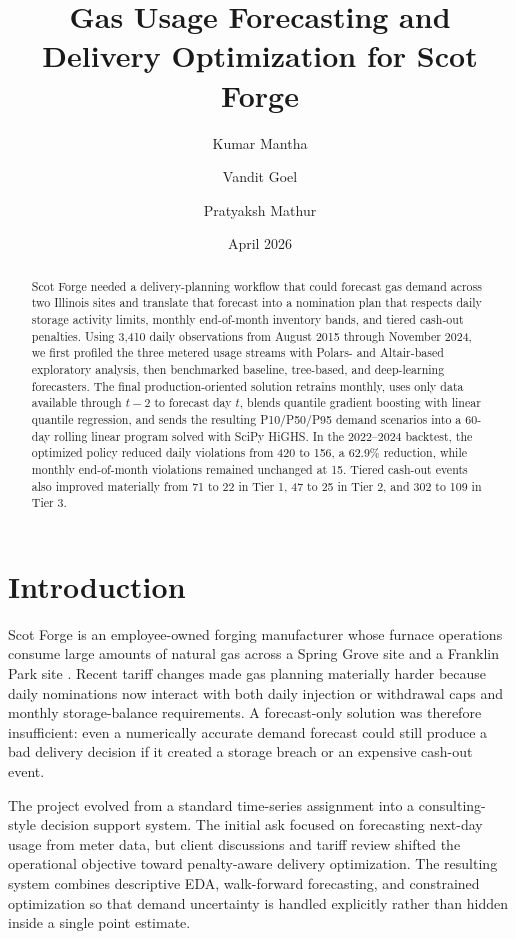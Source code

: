 \documentclass[10pt]{article}
\title{Gas Usage Forecasting and Delivery Optimization for Scot Forge}
\author{Kumar Mantha \and Vandit Goel \and Pratyaksh Mathur}
\date{April 2026}
\begin{document}
\maketitle

\begin{abstract}
Scot Forge needed a delivery-planning workflow that could forecast gas demand across two Illinois sites and translate that forecast into a nomination plan that respects daily storage activity limits, monthly end-of-month inventory bands, and tiered cash-out penalties. Using 3,410 daily observations from August 2015 through November 2024, we first profiled the three metered usage streams with Polars- and Altair-based exploratory analysis, then benchmarked baseline, tree-based, and deep-learning forecasters. The final production-oriented solution retrains monthly, uses only data available through $t-2$ to forecast day $t$, blends quantile gradient boosting with linear quantile regression, and sends the resulting P10/P50/P95 demand scenarios into a 60-day rolling linear program solved with SciPy HiGHS. In the 2022--2024 backtest, the optimized policy reduced daily violations from 420 to 156, a 62.9\% reduction, while monthly end-of-month violations remained unchanged at 15. Tiered cash-out events also improved materially from 71 to 22 in Tier 1, 47 to 25 in Tier 2, and 302 to 109 in Tier 3.
\end{abstract}

\section{Introduction}
Scot Forge is an employee-owned forging manufacturer whose furnace operations consume large amounts of natural gas across a Spring Grove site and a Franklin Park site \citep{problem_statement}. Recent tariff changes made gas planning materially harder because daily nominations now interact with both daily injection or withdrawal caps and monthly storage-balance requirements. A forecast-only solution was therefore insufficient: even a numerically accurate demand forecast could still produce a bad delivery decision if it created a storage breach or an expensive cash-out event.

The project evolved from a standard time-series assignment into a consulting-style decision support system. The initial ask focused on forecasting next-day usage from meter data, but client discussions and tariff review shifted the operational objective toward penalty-aware delivery optimization. The resulting system combines descriptive EDA, walk-forward forecasting, and constrained optimization so that demand uncertainty is handled explicitly rather than hidden inside a single point estimate.
\end{document}
